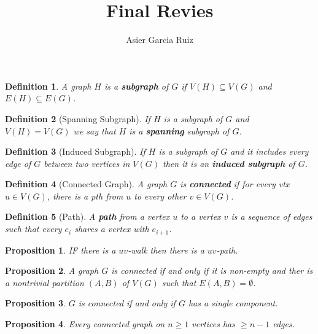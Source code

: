 \documentclass{article}
\title{Final Revies}
\author{Asier Garcia Ruiz}
\newtheorem*{definition}{Definition}
\newtheorem*{proposition}{Proposition}
\begin{document}
\maketitle

\begin{definition}
    A graph $ H $ is a \textbf{subgraph} of $ G $ if $ V(H) \subseteq V(G) $ and $ E(H) \subseteq E(G) $.
\end{definition}

\begin{definition}[Spanning Subgraph]
    If $ H $ is a subgraph of $ G $ and $ V(H) = V(G) $ we say that $ H $ is a \textbf{spanning} subgraph of $ G $.
\end{definition}

\begin{definition}[Induced Subgraph]
    If $ H $ is a subgraph of $ G $ and it includes every edge of $ G $ between two vertices in $ V(G) $ then it is an \textbf{induced subgraph} of $ G $.
\end{definition}

\begin{definition} [Connected Graph]
    A graph $ G $ is \textbf{connected} if for every vtx $ u \in V(G) $, there is a pth from $ u $ to every other $ v \in V(G) $.
\end{definition}

\begin{definition}[Path]
    A \textbf{path} from a vertex $ u $ to a vertex $ v $ is a sequence of edges such that every $ e_i $ shares a vertex with $ e_{i + 1} $.
\end{definition}

\begin{proposition}
    IF there is a $ uv $-walk then there is a $ uv $-path.
\end{proposition}

\begin{proposition}
    A graph $ G $ is connected if and only if it is non-empty and ther is a nontrivial partition $ (A,B) $ of $ V(G) $ such that $ E(A,B) = \emptyset $.
\end{proposition}

\begin{proposition}
    $ G $ is connected if and only if $ G $ has a single component.
\end{proposition}

\begin{proposition}
    Every connected graph on $ n \geq 1 $ vertices has $ \geq n - 1 $ edges.
\end{proposition}
\end{document}

